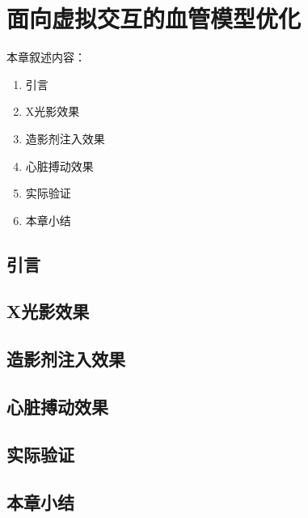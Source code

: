 \chapter{面向虚拟交互的血管模型优化}
\label{chap6}

本章叙述内容：
\begin{enumerate}
  \item 引言
  \item X光影效果
  \item 造影剂注入效果
  \item 心脏搏动效果
  \item 实际验证
  \item 本章小结
\end{enumerate}

\section{引言}

\section{X光影效果}
\label{sec6.2}

\section{造影剂注入效果}

\cite{Taylor2010Review}

\section{心脏搏动效果}

\section{实际验证}

\section{本章小结} 